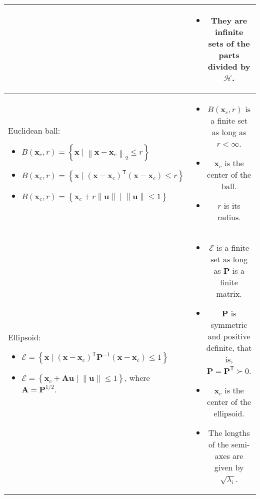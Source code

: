 \documentclass{article}
\newcommand{\trans}{\mathsf{T}}
\newcommand\norm[1]{\left\lVert#1\right\rVert}
\begin{document}
\begin{table}[ht!]
\begin{tabularx}{\textwidth}{|A|C|}
\begin{itemize}[leftmargin=*]
\end{itemize} & \vspace{-3.5ex}
\begin{itemize}[leftmargin=*]
    \item They are infinite sets of the parts divided by \(\mathcal{H}\).
\end{itemize}\\
\hline
Euclidean ball:
\begin{itemize}[leftmargin=*]
    \item \(B(\mathbf{x}_c, r) = \left\{ \mathbf{x} \mid \norm{\mathbf{x}-\mathbf{x}_c}_2 \leq r \right\}\)
    \item \(B(\mathbf{x}_c, r) = \left\{ \mathbf{x} \mid \left( \mathbf{x}-\mathbf{x}_c \right)^\trans \left( \mathbf{x}-\mathbf{x}_c \right) \leq r \right\}\)
    \item \(B(\mathbf{x}_c, r) = \left\{ \mathbf{x}_c + r \norm{\mathbf{u}} \mid \norm{\mathbf{u}} \leq 1 \right\}\)
\end{itemize} & \vspace{-3.5ex}
\begin{itemize}[leftmargin=*]
    \item \(B(\mathbf{x}_c, r)\) is a finite set as long as \(r < \infty\).
    \item \(\mathbf{x}_c\) is the center of the ball.
    \item \(r\) is its radius.
\end{itemize}\\
\hline
Ellipsoid:
\begin{itemize}[leftmargin=*]
    \item \(\mathcal{E} = \left\{ \mathbf{x} \mid (\mathbf{x}-\mathbf{x}_c)^\trans\mathbf{P}^{-1}(\mathbf{x}-\mathbf{x}_c) \leq 1 \right\}\)
    \item \(\mathcal{E} = \left\{ \mathbf{x}_{c} + \mathbf{Au} \mid \norm{\mathbf{u}} \leq 1 \right\}\), where \(\mathbf{A} = \mathbf{P}^{1/2}\).
\end{itemize} & \vspace{-3.5ex}
\begin{itemize}[leftmargin=*]
    \item \(\mathcal{E}\) is a finite set as long as \(\mathbf{P}\) is a finite matrix.
    \item \(\mathbf{P}\) is symmetric and positive definite, that is, \(\mathbf{P}=\mathbf{P}^\trans \succ 0\).
    \item \(\mathbf{x}_{c}\) is the center of the ellipsoid.
    \item The lengths of the semi-axes are given by \(\sqrt{\lambda_i}\).

\end{itemize}
\end{tabularx}
\end{table}
\end{document}

